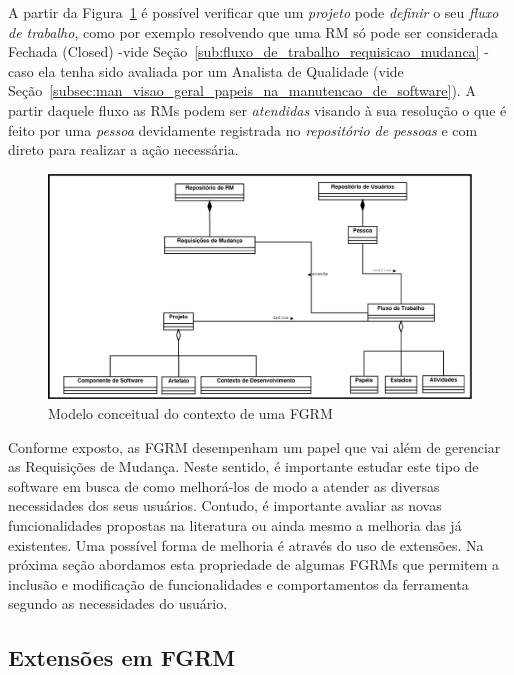 A partir da Figura~\ref{fig:diagrama-classe-conceitual-fgrm} é possível
verificar que um \textit{projeto} pode \textit{definir} o seu \textit{fluxo de
	trabalho}, como por exemplo resolvendo que uma RM só pode ser considerada
Fechada (Closed) \@-\@ vide Seção~\ref{sub:fluxo_de_trabalho_requisicao_mudanca}
\@-\@ caso ela tenha sido avaliada por um Analista de Qualidade (vide
Seção~\ref{subsec:man_visao_geral_papeis_na_manutencao_de_software}). A partir
daquele fluxo as RMs podem ser \textit{atendidas} visando à sua resolução o que
é feito por uma \textit{pessoa} devidamente registrada no \textit{repositório de
	pessoas} e com direto para realizar a ação necessária.

\begin{figure}[htpb] \centering
	\includegraphics[width=1.15\linewidth]{./chapter-manutencao-software-visao-geral/img/diagrama-classe-conceitual-fgrm.pdf}
	\caption{Modelo conceitual do contexto de uma FGRM}
\label{fig:diagrama-classe-conceitual-fgrm}
\end{figure}

Conforme exposto, as FGRM desempenham um papel que vai além de gerenciar as
Requisições de Mudança. Neste sentido, é importante estudar este tipo de
software em busca de como melhorá-los de modo a atender as diversas necessidades
dos seus usuários. Contudo, é importante avaliar as novas funcionalidades
propostas na li\-te\-ra\-tu\-ra ou ainda mesmo a melhoria das já existentes. Uma
possível forma de melhoria é através do uso de extensões. Na próxima seção
abordamos esta propriedade de algumas FGRMs que permitem a inclusão e
modificação de funcionalidades e comportamentos da ferramenta segundo as
necessidades do usuário.
\todoend{}

\subsection{Extensões em FGRM}
\label{subsec:manutencao_visao_geral_extensoes_fgrm}

